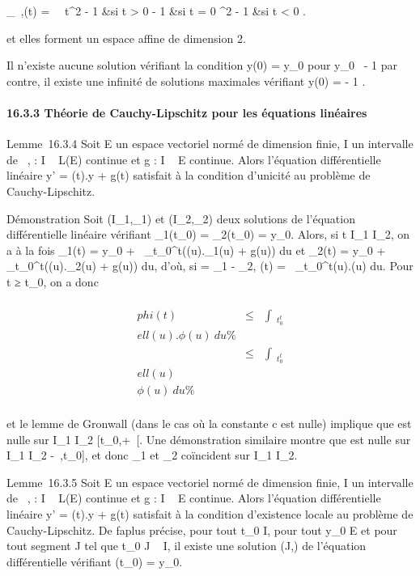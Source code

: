 \documentclass[]{article}
\begin{document}
 \phi_\lambda~,\mu(t) = \left \
\cases \lambda~t^2 - 1 
&si t \textgreater{} 0 \cr - 1  &si t = 0 \cr \mut^2 - 1
\over 2 &si t \textless{} 0  \right .

et elles forment un espace affine de dimension 2.

Il n'existe aucune solution vérifiant la condition y(0) = y_0
pour y_0\neq~ - 1  par contre, il existe une infinité de solutions maximales vérifiant
y(0) = - 1 \over 2 .

\paragraph{16.3.3 Théorie de Cauchy-Lipschitz pour les équations
linéaires}

Lemme~16.3.4 Soit E un espace vectoriel normé de dimension finie, I un
intervalle de \mathbb{R}~, \ell : I \rightarrow~ L(E) continue et g : I \rightarrow~ E continue. Alors
l'équation différentielle linéaire y' = \ell(t).y + g(t) satisfait à la
condition d'unicité au problème de Cauchy-Lipschitz.

Démonstration Soit (I_1,\phi_1) et
(I_2,\phi_2) deux solutions de l'équation différentielle
linéaire vérifiant \phi_1(t_0) =
\phi_2(t_0) = y_0. Alors, si t \in I_1 \bigcap
I_2, on a à la fois \phi_1(t) = y_0
+\int ~
_t_0^t(\ell(u).\phi_1(u) + g(u)) du et
\phi_2(t) = y_0 +\int ~
_t_0^t(\ell(u).\phi_2(u) + g(u)) du, d'où, si
\phi = \phi_1 - \phi_2, \phi(t) =\int ~
_t_0^t\ell(u).\phi(u) du. Pour t ≥ t_0, on a
donc

\begin{align*}
\\phi(t)& \leq&
\int ~
_t_0^t\\ell(u).\phi(u)\
du\%& \\ & \leq&
\int ~
_t_0^t\\ell(u)\\\phi(u)\
du \%& \\
\end{align*}

et le lemme de Gronwall (dans le cas où la constante c est nulle)
implique que \phi est nulle sur I_1 \bigcap I_2 \bigcap
{[}t_0,+\infty~{[}. Une démonstration similaire montre que \phi est
nulle sur I_1 \bigcap I_2\bigcap{]} -\infty~,t_0{]}, et donc
\phi_1 et \phi_2 coïncident sur I_1 \bigcap I_2.

Lemme~16.3.5 Soit E un espace vectoriel normé de dimension finie, I un
intervalle de \mathbb{R}~, \ell : I \rightarrow~ L(E) continue et g : I \rightarrow~ E continue. Alors
l'équation différentielle linéaire y' = \ell(t).y + g(t) satisfait à la
condition d'existence locale au problème de Cauchy-Lipschitz. De
fa\ccon plus précise, pour tout t_0 \in I,
pour tout y_0 \in E et pour tout segment J tel que t_0 \in
J \subset~ I, il existe une solution (J,\phi) de l'équation différentielle
vérifiant \phi(t_0) = y_0.
\end{document}
